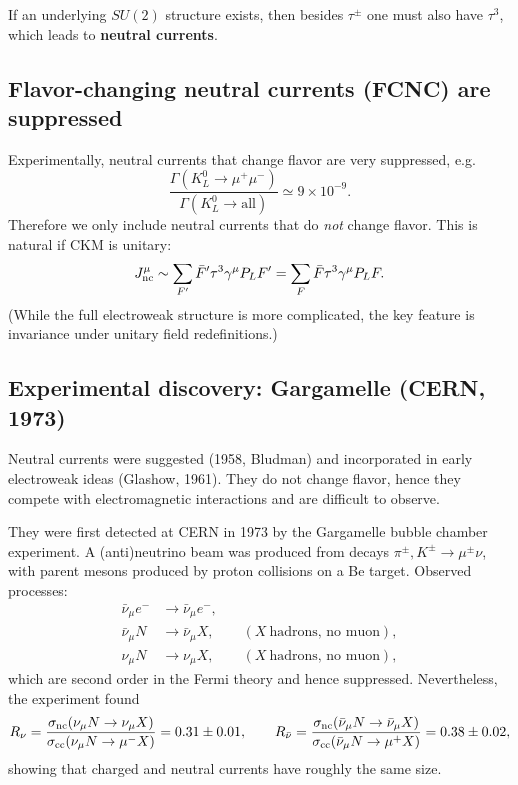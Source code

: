 If an underlying $SU(2)$ structure exists, then besides $\tau^\pm$ one must also have $\tau^3$,
which leads to \textbf{neutral currents}.

\subsection{Flavor-changing neutral currents (FCNC) are suppressed}
Experimentally, neutral currents that change flavor are very suppressed, e.g.
\begin{equation}
\frac{\Gamma(K_L^0\to \mu^+\mu^-)}{\Gamma(K_L^0\to \text{all})}\simeq 9\times 10^{-9}.
\end{equation}
Therefore we only include neutral currents that do \emph{not} change flavor.
This is natural if CKM is unitary:
\begin{equation}
J^\mu_{\rm nc}\sim \sum_{F'}\bar F'\tau^3\gamma^\mu P_L F'
=
\sum_F \bar F\tau^3\gamma^\mu P_L F.
\end{equation}
(While the full electroweak structure is more complicated, the key feature is invariance under
unitary field redefinitions.)

\subsection{Experimental discovery: Gargamelle (CERN, 1973)}
Neutral currents were suggested (1958, Bludman) and incorporated in early electroweak ideas (Glashow, 1961).
They do not change flavor, hence they compete with electromagnetic interactions and are difficult to observe.

They were first detected at CERN in 1973 by the Gargamelle bubble chamber experiment.
A (anti)neutrino beam was produced from decays $\pi^\pm,K^\pm\to \mu^\pm\nu$,
with parent mesons produced by proton collisions on a Be target. Observed processes:
\begin{align}
\bar\nu_\mu e^- &\to \bar\nu_\mu e^-,\\
\bar\nu_\mu N &\to \bar\nu_\mu X,\qquad (X~\text{hadrons, no muon}),\\
\nu_\mu N &\to \nu_\mu X,\qquad (X~\text{hadrons, no muon}),
\end{align}
which are second order in the Fermi theory and hence suppressed. Nevertheless, the experiment found
\begin{equation}
R_\nu=\frac{\sigma_{\rm nc}(\nu_\mu N\to \nu_\mu X)}{\sigma_{\rm cc}(\nu_\mu N\to \mu^- X)}=0.31\pm 0.01,
\qquad
R_{\bar\nu}=\frac{\sigma_{\rm nc}(\bar\nu_\mu N\to \bar\nu_\mu X)}{\sigma_{\rm cc}(\bar\nu_\mu N\to \mu^+ X)}=0.38\pm 0.02,
\end{equation}
showing that charged and neutral currents have roughly the same size.

